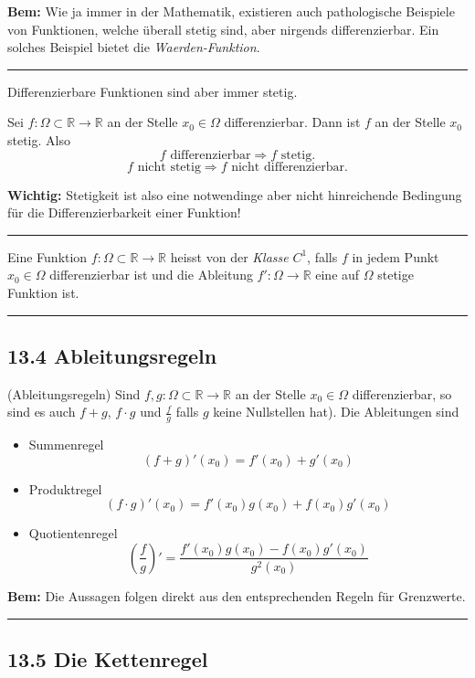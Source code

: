 \documentclass[a4paper,landscape,8pt]{extarticle}
\newcommand{\R}{\mathbb{R}}
\newcommand{\sep}{\vspace{5pt}\noindent\hrule\vspace{5pt}}
\newcommand{\Bem}{\textbf{Bem: }}
\newcommand{\Wichtig}{\textbf{Wichtig: }}
\begin{document}
\begin{multicols*}{4}
\begin{warmup}
\Bem Wie ja immer in der Mathematik, existieren auch pathologische Beispiele von
Funktionen, welche überall stetig sind, aber nirgends differenzierbar. Ein
solches Beispiel bietet die \emph{Waerden-Funktion}.
\end{warmup}

\sep

Differenzierbare Funktionen sind aber immer stetig.

\Satz Sei $f\colon\Omega\subset\R\to\R$ an der Stelle $x_0\in\Omega$
differenzierbar. Dann ist $f$ an der Stelle $x_0$ stetig. Also
\[
f \text{ differenzierbar} \Longrightarrow f \text{ stetig.}
\]
\[
f \text{ nicht stetig} \Longrightarrow f \text{ nicht differenzierbar}.
\]

\Wichtig Stetigkeit ist also eine notwendinge aber nicht hinreichende Bedingung
für die Differenzierbarkeit einer Funktion!

\sep

\Def Eine Funktion $f\colon\Omega\subset\R\to\R$ heisst von der \emph{Klasse}
$C^1$, falls $f$ in jedem Punkt $x_0\in\Omega$ differenzierbar ist und die
Ableitung $f'\colon\Omega\to\R$ eine auf $\Omega$ stetige Funktion ist.

\sep

\subsection{13.4 Ableitungsregeln}

\Satz (Ableitungsregeln) Sind $f,g\colon\Omega\subset\R\to\R$ an der Stelle
$x_0\in\Omega$ differenzierbar, so sind es auch $f+g$, $f\cdot g$ und
$\frac{f}{g}$ falls $g$ keine Nullstellen hat). Die Ableitungen sind
\begin{itemize}
  \item Summenregel
  \[(f+g)'(x_0) = f'(x_0) + g'(x_0)\]
  \item Produktregel
  \[(f\cdot g)'(x_0) = f'(x_0)g(x_0) + f(x_0)g'(x_0)\]
  \item Quotientenregel
  \[\left(\frac{f}{g}\right)'=
  \frac{f'(x_0)g(x_0) - f(x_0)g'(x_0)}{g^2(x_0)}\]
\end{itemize}

\Bem Die Aussagen folgen direkt aus den entsprechenden Regeln für Grenzwerte.

\sep

\subsection{13.5 Die Kettenregel}


\end{multicols*}
\end{document}
